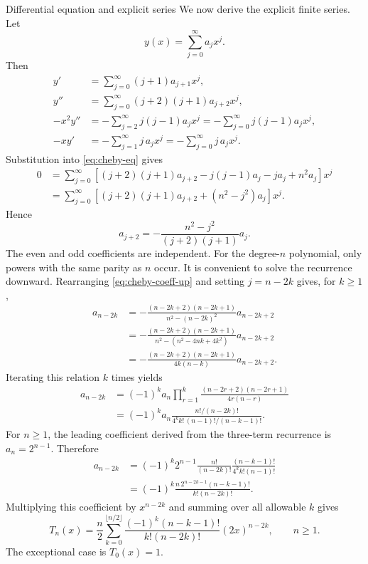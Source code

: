 \documentclass[11pt]{beamer}
\begin{document}
\begin{frame}[allowframebreaks]{Differential equation and explicit series}
We now derive the explicit finite series.  Let
\[
  y(x)=\sum_{j=0}^{\infty}a_jx^j.
\]
Then
\begin{align*}
  y'
    &=\sum_{j=0}^{\infty}(j+1)a_{j+1}x^j,\\
  y''
    &=\sum_{j=0}^{\infty}(j+2)(j+1)a_{j+2}x^j,\\
  -x^2y''
    &=-\sum_{j=2}^{\infty}j(j-1)a_jx^j
      =-\sum_{j=0}^{\infty}j(j-1)a_jx^j,\\
  -xy'
    &=-\sum_{j=1}^{\infty}j\,a_jx^j
      =-\sum_{j=0}^{\infty}j\,a_jx^j.
\end{align*}
Substitution into \eqref{eq:cheby-eq} gives
\begin{align*}
  0
   &=
    \sum_{j=0}^{\infty}
    \left[
      (j+2)(j+1)a_{j+2}
      -j(j-1)a_j-ja_j+n^2a_j
    \right]x^j\\
   &=
    \sum_{j=0}^{\infty}
    \left[
      (j+2)(j+1)a_{j+2}
      +(n^2-j^2)a_j
    \right]x^j.
\end{align*}
Hence
\begin{equation}
  a_{j+2}
    =-\frac{n^2-j^2}{(j+2)(j+1)}a_j.
  \label{eq:cheby-coeff-up}
\end{equation}
The even and odd coefficients are independent.  For the degree-$n$ polynomial,
only powers with the same parity as $n$ occur.  It is convenient to solve the
recurrence downward.  Rearranging \eqref{eq:cheby-coeff-up} and setting
$j=n-2k$ gives, for $k\ge1$,
\begin{align*}
  a_{n-2k}
   &=
    -\frac{(n-2k+2)(n-2k+1)}
            {n^2-(n-2k)^2}
      a_{n-2k+2}\\
   &=
    -\frac{(n-2k+2)(n-2k+1)}
            {n^2-\left(n^2-4nk+4k^2\right)}
      a_{n-2k+2}\\
   &=
    -\frac{(n-2k+2)(n-2k+1)}
            {4k(n-k)}
      a_{n-2k+2}.
\end{align*}
Iterating this relation $k$ times yields
\begin{align*}
  a_{n-2k}
   &=
    (-1)^k a_n
    \prod_{r=1}^{k}
      \frac{(n-2r+2)(n-2r+1)}
           {4r(n-r)}\\
   &=
    (-1)^k a_n
    \frac{n!/(n-2k)!}
         {4^k k!\,(n-1)!/(n-k-1)!}.
\end{align*}
For $n\ge1$, the leading coefficient derived from the three-term recurrence is
$a_n=2^{n-1}$.  Therefore
\begin{align*}
  a_{n-2k}
   &=
    (-1)^k 2^{n-1}
    \frac{n!}{(n-2k)!}
    \frac{(n-k-1)!}{4^k k!(n-1)!}\\
   &=
    (-1)^k
    \frac{n\,2^{n-2k-1}(n-k-1)!}
         {k!(n-2k)!}.
\end{align*}
Multiplying this coefficient by $x^{n-2k}$ and summing over all allowable $k$
gives
\begin{equation}
  T_n(x)
   =\frac{n}{2}
    \sum_{k=0}^{\lfloor n/2\rfloor}
      \frac{(-1)^k(n-k-1)!}
           {k!(n-2k)!}
      (2x)^{n-2k},
  \qquad n\ge1.
  \label{eq:cheby-explicit}
\end{equation}
The exceptional case is $T_0(x)=1$.


\end{frame}
\end{document}
